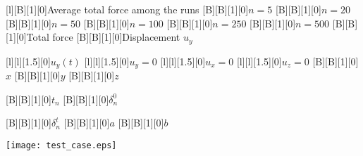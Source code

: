 \documentclass[border=12pt, crop]{standalone}
\begin{document}
  
  
      [l][B][1][0]{Average total force among the runs}
      [B][B][1][0]{$n = 5$}
      [B][B][1][0]{$n = 20$}
      [B][B][1][0]{$n = 50$}
      [B][B][1][0]{$n = 100$}
      [B][B][1][0]{$n = 250$}
      [B][B][1][0]{$n = 500$}
      [B][B][1][0]{Total force}
      [B][B][1][0]{Displacement $u_y$}
            
      [l][l][1.5][0]{$u_y(t)$}
      [l][l][1.5][0]{$u_y = 0$}
      [l][l][1.5][0]{$u_x = 0$}
      [l][l][1.5][0]{$u_z = 0$}
 [B][B][1][0]{$x$}
  [B][B][1][0]{$y$}  
  [B][B][1][0]{$z$}
  
    [B][B][1][0]{$t_n$}
        [B][B][1][0]{$\delta_n^0$}

    [B][B][1][0]{$\delta_n^t$}
    [B][B][1][0]{$a$}
    [B][B][1][0]{$b$}


      \texttt{[image: test\_case.eps]}

    
\end{document}
